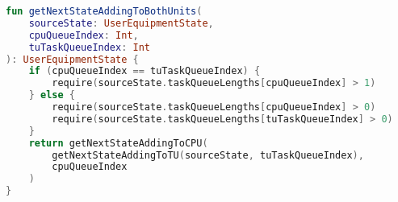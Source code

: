 \newpage
\begin{latin}
	\begin{lstlisting}[language=Kotlin, title=\rl{تابع انتقال حالت با کنش اجرا و ارسال به طور همزمان}]
fun getNextStateAddingToBothUnits(
    sourceState: UserEquipmentState,
    cpuQueueIndex: Int,
    tuTaskQueueIndex: Int
): UserEquipmentState {
	if (cpuQueueIndex == tuTaskQueueIndex) {
		require(sourceState.taskQueueLengths[cpuQueueIndex] > 1)
	} else {
		require(sourceState.taskQueueLengths[cpuQueueIndex] > 0)
		require(sourceState.taskQueueLengths[tuTaskQueueIndex] > 0)
	}
	return getNextStateAddingToCPU(
	    getNextStateAddingToTU(sourceState, tuTaskQueueIndex),
	    cpuQueueIndex
	)
}
	\end{lstlisting}
\end{latin}


\clearpage